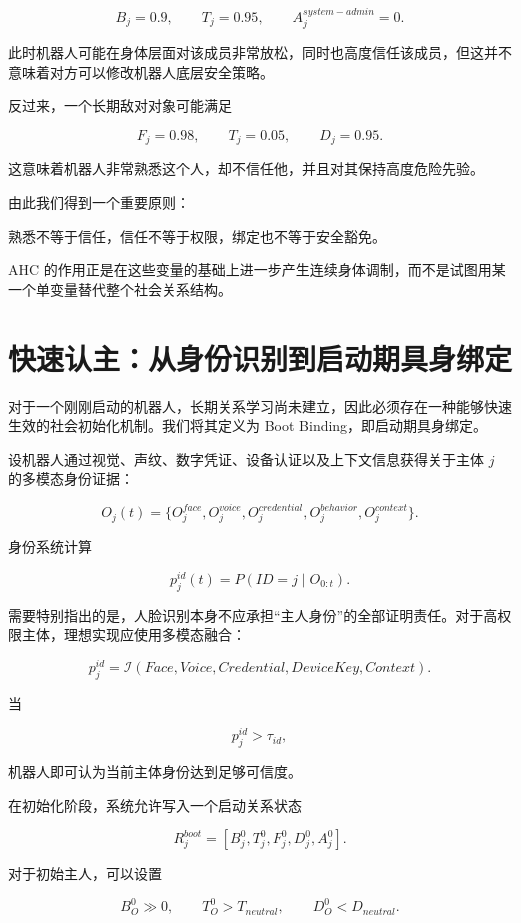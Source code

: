 \[
B_j=0.9,
\qquad
T_j=0.95,
\qquad
A_j^{system-admin}=0.
\]

此时机器人可能在身体层面对该成员非常放松，同时也高度信任该成员，但这并不意味着对方可以修改机器人底层安全策略。

反过来，一个长期敌对对象可能满足

\[
F_j=0.98,
\qquad
T_j=0.05,
\qquad
D_j=0.95.
\]

这意味着机器人非常熟悉这个人，却不信任他，并且对其保持高度危险先验。

由此我们得到一个重要原则：

\begin{proposition*}
熟悉不等于信任，信任不等于权限，绑定也不等于安全豁免。
\end{proposition*}

AHC 的作用正是在这些变量的基础上进一步产生连续身体调制，而不是试图用某一个单变量替代整个社会关系结构。


\section{快速认主：从身份识别到启动期具身绑定}

对于一个刚刚启动的机器人，长期关系学习尚未建立，因此必须存在一种能够快速生效的社会初始化机制。我们将其定义为 Boot Binding，即启动期具身绑定。

设机器人通过视觉、声纹、数字凭证、设备认证以及上下文信息获得关于主体 $j$ 的多模态身份证据：

\[
O_j(t)
=
\{
O_j^{face},
O_j^{voice},
O_j^{credential},
O_j^{behavior},
O_j^{context}
\}.
\]

身份系统计算

\[
p_j^{id}(t)
=
P(ID=j\mid O_{0:t}).
\]

需要特别指出的是，人脸识别本身不应承担“主人身份”的全部证明责任。对于高权限主体，理想实现应使用多模态融合：

\[
p_j^{id}
=
\mathcal I
\left(
Face,
Voice,
Credential,
DeviceKey,
Context
\right).
\]

当

\[
p_j^{id}>\tau_{id},
\]

机器人即可认为当前主体身份达到足够可信度。

在初始化阶段，系统允许写入一个启动关系状态

\[
R_j^{boot}
=
\left[
B_j^0,
T_j^0,
F_j^0,
D_j^0,
A_j^0
\right].
\]

对于初始主人，可以设置

\[
B_O^0\gg 0,
\qquad
T_O^0>T_{neutral},
\qquad
D_O^0<D_{neutral}.
\]

